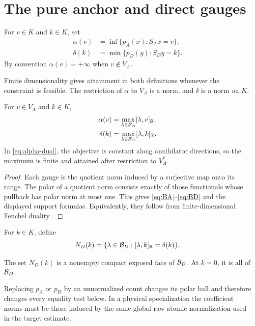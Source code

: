 \section{The pure anchor and direct gauges}
\label{sec:pure}

\begin{definition}\label{def:pure}
For \(v\in K\) and \(k\in K\), set
\begin{align}
 \alpha(v)
 &=
 \inf\{p_A(x):S_Ax=v\},
 \label{eq:alpha}\\
 \delta(k)
 &=
 \min\{p_D(y):S_Dy=k\}.
 \label{eq:delta}
\end{align}
By convention \(\alpha(v)=+\infty\) when \(v\notin V_A\).
\end{definition}

Finite dimensionality gives attainment in both definitions whenever
the constraint is feasible.  The restriction of \(\alpha\) to \(V_A\)
is a norm, and \(\delta\) is a norm on \(K\).

\begin{proposition}\label{prop:pure-dual}
For \(v\in V_A\) and \(k\in K\),
\begin{align}
 \alpha(v)
 &=
 \max_{\lambda\in\mathcal B_A}[\lambda,v]_{\mathbb R},
 \label{eq:alpha-dual}\\
 \delta(k)
 &=
 \max_{\lambda\in\mathcal B_D}[\lambda,k]_{\mathbb R}.
 \label{eq:delta-dual}
\end{align}
In \eqref{eq:alpha-dual}, the objective is constant along annihilator
directions, so the maximum is finite and attained after restriction to
\(V_A^*\).
\end{proposition}

\begin{proof}
Each gauge is the quotient norm induced by a surjective map onto its
range.  The polar of a quotient norm consists exactly of those
functionals whose pullback has polar norm at most one.  This gives
\eqref{eq:BA}--\eqref{eq:BD} and the displayed support formulas.
Equivalently, they follow from finite-dimensional Fenchel duality
\cite{Rockafellar1970}.
\end{proof}

\begin{definition}\label{def:norming}
For \(k\in K\), define
\[
 N_D(k)
 =
 \{\lambda\in\mathcal B_D:[\lambda,k]_{\mathbb R}=\delta(k)\}.
\]
\end{definition}

The set \(N_D(k)\) is a nonempty compact exposed face of \(\mathcal B_D\).
At \(k=0\), it is all of \(\mathcal B_D\).

\begin{remark}
Replacing \(p_A\) or \(p_D\) by an unnormalized count changes its polar
ball and therefore changes every equality test below.  In a physical
specialization the coefficient norms must be those induced by the same
global raw atomic normalization used in the target estimate.
\end{remark}
